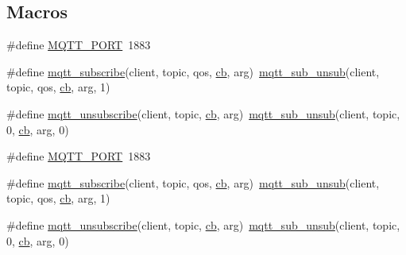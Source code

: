 \subsection*{Macros}
\begin{DoxyCompactItemize}
\item 
\#define \hyperlink{group__mqtt_gaa8632baff6bbb5004385998918f1e6bd}{M\+Q\+T\+T\+\_\+\+P\+O\+RT}~1883
\item 
\#define \hyperlink{group__mqtt_ga83d6a6d811b201a74d793bc1b5d4e029}{mqtt\+\_\+subscribe}(client,  topic,  qos,  \hyperlink{periph__rtt_2main_8c_afd4145001d494db2ea612e1239724148}{cb},  arg)~\hyperlink{openmote-cc2538_2lwip_2src_2include_2lwip_2apps_2mqtt_8h_afdb39d4a9758f98c02451aaa9a9b3103}{mqtt\+\_\+sub\+\_\+unsub}(client, topic, qos, \hyperlink{periph__rtt_2main_8c_afd4145001d494db2ea612e1239724148}{cb}, arg, 1)
\item 
\#define \hyperlink{group__mqtt_ga0f133ef09cbe56c46ebe2cc21afccf3f}{mqtt\+\_\+unsubscribe}(client,  topic,  \hyperlink{periph__rtt_2main_8c_afd4145001d494db2ea612e1239724148}{cb},  arg)~\hyperlink{openmote-cc2538_2lwip_2src_2include_2lwip_2apps_2mqtt_8h_afdb39d4a9758f98c02451aaa9a9b3103}{mqtt\+\_\+sub\+\_\+unsub}(client, topic, 0, \hyperlink{periph__rtt_2main_8c_afd4145001d494db2ea612e1239724148}{cb}, arg, 0)
\item 
\#define \hyperlink{group__mqtt_gaa8632baff6bbb5004385998918f1e6bd}{M\+Q\+T\+T\+\_\+\+P\+O\+RT}~1883
\item 
\#define \hyperlink{group__mqtt_ga83d6a6d811b201a74d793bc1b5d4e029}{mqtt\+\_\+subscribe}(client,  topic,  qos,  \hyperlink{periph__rtt_2main_8c_afd4145001d494db2ea612e1239724148}{cb},  arg)~\hyperlink{openmote-cc2538_2lwip_2src_2include_2lwip_2apps_2mqtt_8h_afdb39d4a9758f98c02451aaa9a9b3103}{mqtt\+\_\+sub\+\_\+unsub}(client, topic, qos, \hyperlink{periph__rtt_2main_8c_afd4145001d494db2ea612e1239724148}{cb}, arg, 1)
\item 
\#define \hyperlink{group__mqtt_ga0f133ef09cbe56c46ebe2cc21afccf3f}{mqtt\+\_\+unsubscribe}(client,  topic,  \hyperlink{periph__rtt_2main_8c_afd4145001d494db2ea612e1239724148}{cb},  arg)~\hyperlink{openmote-cc2538_2lwip_2src_2include_2lwip_2apps_2mqtt_8h_afdb39d4a9758f98c02451aaa9a9b3103}{mqtt\+\_\+sub\+\_\+unsub}(client, topic, 0, \hyperlink{periph__rtt_2main_8c_afd4145001d494db2ea612e1239724148}{cb}, arg, 0)
\end{DoxyCompactItemize}
